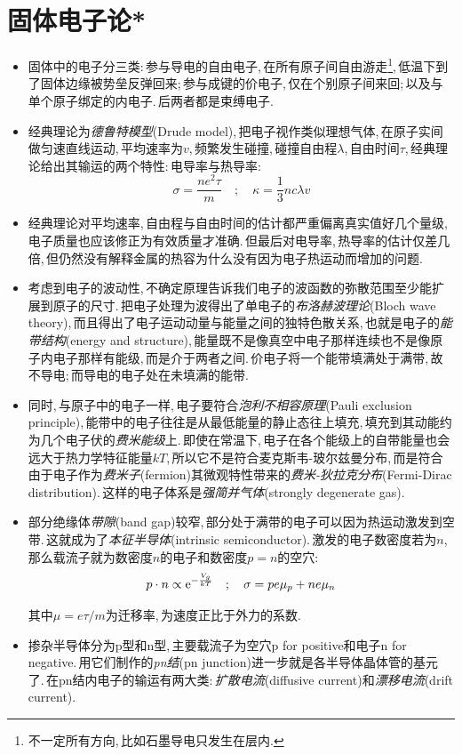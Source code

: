 \section{固体电子论*}
\begin{itemize}
	\item 固体中的电子分三类:\,参与导电的自由电子,\,在所有原子间自由游走\footnote{不一定所有方向,\,比如石墨导电只发生在层内.},\,低温下到了固体边缘被势垒反弹回来;\,参与成键的价电子,\,仅在个别原子间来回;\,以及与单个原子绑定的内电子.\,后两者都是束缚电子.
	\item 经典理论为\emph{德鲁特模型}(Drude model),\,把电子视作类似理想气体,\,在原子实间做匀速直线运动,\,平均速率为$v$,\,频繁发生碰撞,\,碰撞自由程$\lambda$,\,自由时间$\tau$,\,经典理论给出其输运的两个特性:\,电导率与热导率:
	\[\sigma=\frac{ne^2\tau}{m}\quad ;\quad \kappa=\frac{1}{3}nc\lambda v\]

	\item 经典理论对平均速率,\,自由程与自由时间的估计都严重偏离真实值好几个量级,\,电子质量也应该修正为有效质量才准确.\,但最后对电导率,\,热导率的估计仅差几倍,\,但仍然没有解释金属的热容为什么没有因为电子热运动而增加的问题.
	\item 考虑到电子的波动性,\,不确定原理告诉我们电子的波函数的弥散范围至少能扩展到原子的尺寸.\,把电子处理为波得出了单电子的\emph{布洛赫波理论}(Bloch wave theory),\,而且得出了电子运动动量与能量之间的独特色散关系,\,也就是电子的\emph{能带结构}(energy and structure),\,能量既不是像真空中电子那样连续也不是像原子内电子那样有能级,\,而是介于两者之间.\,价电子将一个能带填满处于满带,\,故不导电;\,而导电的电子处在未填满的能带.

	\item 同时,\,与原子中的电子一样,\,电子要符合\emph{泡利不相容原理}(Pauli exclusion principle),\,能带中的电子往往是从最低能量的静止态往上填充,\,填充到其动能约为几个电子伏的\emph{费米能级}上.\,即使在常温下,\,电子在各个能级上的自带能量也会远大于热力学特征能量$kT$,\,所以它不是符合麦克斯韦-玻尔兹曼分布,\,而是符合由于电子作为\emph{费米子}(fermion)其微观特性带来的\emph{费米-狄拉克分布}(Fermi-Dirac distribution).\,这样的电子体系是\emph{强简并气体}(strongly degenerate gas).
	\item 部分绝缘体\emph{带隙}(band gap)较窄,\,部分处于满带的电子可以因为热运动激发到空带.\,这就成为了\emph{本征半导体}(intrinsic semiconductor).\,激发的电子数密度若为$n$,\,那么载流子就为数密度$n$的电子和数密度$p=n$的空穴:
	\[p\cdot n\propto {\rm e}^{-\frac{V_g}{kT}}\quad ;\quad \sigma=pe\mu_p+ne\mu_n\]

	其中$\mu=e\tau/m$为迁移率,\,为速度正比于外力的系数.

	\item 掺杂半导体分为p型和n型,\,主要载流子为空穴p for positive和电子n for negative.\,用它们制作的\emph{pn结}(pn junction)进一步就是各半导体晶体管的基元了.\,在pn结内电子的输运有两大类:\,\emph{扩散电流}(diffusive current)和\emph{漂移电流}(drift current).
\end{itemize}

